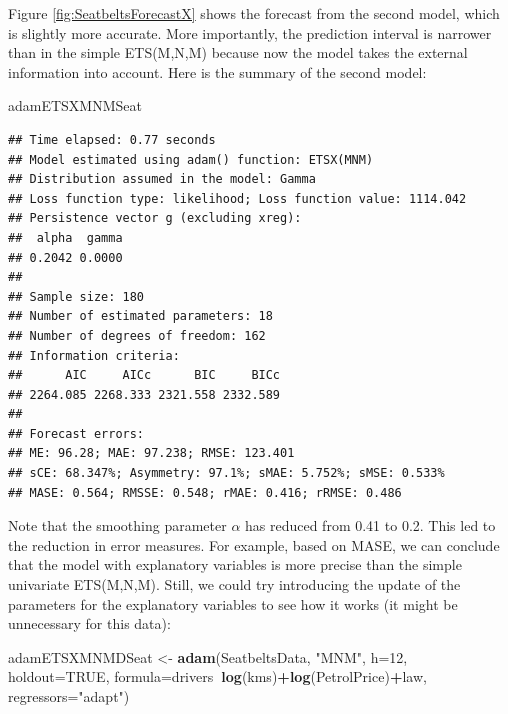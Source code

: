 \documentclass[]{book}
\newenvironment{Shaded}{\begin{snugshade}}{\end{snugshade}}
\newcommand{\DataTypeTok}[1]{\textcolor[rgb]{0.13,0.29,0.53}{#1}}
\newcommand{\DecValTok}[1]{\textcolor[rgb]{0.00,0.00,0.81}{#1}}
\newcommand{\KeywordTok}[1]{\textcolor[rgb]{0.13,0.29,0.53}{\textbf{#1}}}
\newcommand{\NormalTok}[1]{#1}
\newcommand{\OperatorTok}[1]{\textcolor[rgb]{0.81,0.36,0.00}{\textbf{#1}}}
\newcommand{\OtherTok}[1]{\textcolor[rgb]{0.56,0.35,0.01}{#1}}
\newcommand{\StringTok}[1]{\textcolor[rgb]{0.31,0.60,0.02}{#1}}
\theoremstyle{definition}
\theoremstyle{definition}
\theoremstyle{definition}
\theoremstyle{definition}
\theoremstyle{remark}
\begin{document}
Figure \ref{fig:SeatbeltsForecastX} shows the forecast from the second model, which is slightly more accurate. More importantly, the prediction interval is narrower than in the simple ETS(M,N,M) because now the model takes the external information into account. Here is the summary of the second model:

\begin{Shaded}
\begin{Highlighting}[]
\NormalTok{adamETSXMNMSeat}
\end{Highlighting}
\end{Shaded}

\begin{verbatim}
## Time elapsed: 0.77 seconds
## Model estimated using adam() function: ETSX(MNM)
## Distribution assumed in the model: Gamma
## Loss function type: likelihood; Loss function value: 1114.042
## Persistence vector g (excluding xreg):
##  alpha  gamma 
## 0.2042 0.0000 
## 
## Sample size: 180
## Number of estimated parameters: 18
## Number of degrees of freedom: 162
## Information criteria:
##      AIC     AICc      BIC     BICc 
## 2264.085 2268.333 2321.558 2332.589 
## 
## Forecast errors:
## ME: 96.28; MAE: 97.238; RMSE: 123.401
## sCE: 68.347%; Asymmetry: 97.1%; sMAE: 5.752%; sMSE: 0.533%
## MASE: 0.564; RMSSE: 0.548; rMAE: 0.416; rRMSE: 0.486
\end{verbatim}

Note that the smoothing parameter \(\alpha\) has reduced from 0.41 to 0.2. This led to the reduction in error measures. For example, based on MASE, we can conclude that the model with explanatory variables is more precise than the simple univariate ETS(M,N,M). Still, we could try introducing the update of the parameters for the explanatory variables to see how it works (it might be unnecessary for this data):

\begin{Shaded}
\begin{Highlighting}[]
\NormalTok{adamETSXMNMDSeat <-}\StringTok{ }\KeywordTok{adam}\NormalTok{(SeatbeltsData, }\StringTok{"MNM"}\NormalTok{, }\DataTypeTok{h=}\DecValTok{12}\NormalTok{, }\DataTypeTok{holdout=}\OtherTok{TRUE}\NormalTok{,}
                         \DataTypeTok{formula=}\NormalTok{drivers}\OperatorTok{~}\KeywordTok{log}\NormalTok{(kms)}\OperatorTok{+}\KeywordTok{log}\NormalTok{(PetrolPrice)}\OperatorTok{+}\NormalTok{law,}
                         \DataTypeTok{regressors=}\StringTok{"adapt"}\NormalTok{)}
\end{Highlighting}
\end{Shaded}
\end{document}
